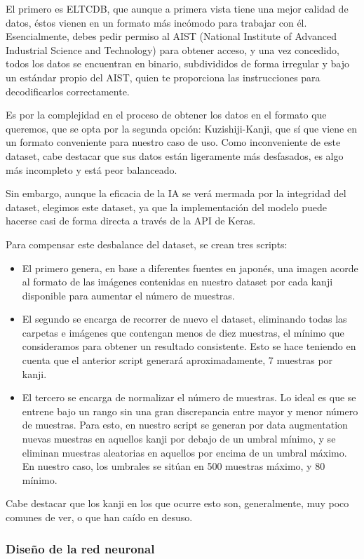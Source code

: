 \documentclass{article}
\begin{document}
El primero es ELTCDB, que aunque a primera vista tiene una mejor calidad de datos, éstos vienen en un formato más incómodo para trabajar con él. Esencialmente, debes pedir permiso al AIST (National Institute of Advanced Industrial Science and Technology) para obtener acceso, y una vez concedido, todos los datos se encuentran en binario, subdivididos de forma irregular y bajo un estándar propio del AIST, quien te proporciona las instrucciones para decodificarlos correctamente.

Es por la complejidad en el proceso de obtener los datos en el formato que queremos, que se opta por la segunda opción: Kuzishiji-Kanji, que sí que viene en un formato conveniente para nuestro caso de uso. Como inconveniente de este dataset, cabe destacar que sus datos están ligeramente más desfasados, es algo más incompleto y está peor balanceado.

Sin embargo, aunque la eficacia de la IA se verá mermada por la integridad del dataset, elegimos este dataset, ya que la implementación del modelo puede hacerse casi de forma directa a través de la API de Keras.

Para compensar este desbalance del dataset, se crean tres scripts:
\begin{itemize}
	\item El primero genera, en base a diferentes fuentes en japonés, una imagen acorde al formato de las imágenes contenidas en nuestro dataset por cada kanji disponible para aumentar el número de muestras.
	\item El segundo se encarga de recorrer de nuevo el dataset, eliminando todas las carpetas e imágenes que contengan menos de diez muestras, el mínimo que consideramos para obtener un resultado consistente. Esto se hace teniendo en cuenta que el anterior script generará aproximadamente, 7 muestras por kanji.
	\item El tercero se encarga de normalizar el número de muestras. Lo ideal es que se entrene bajo un rango sin una gran discrepancia entre mayor y menor número de muestras. Para esto, en nuestro script se generan por data augmentation nuevas muestras en aquellos kanji por debajo de un umbral mínimo, y se eliminan muestras aleatorias en aquellos por encima de un umbral máximo. En nuestro caso, los umbrales se sitúan en 500 muestras máximo, y 80 mínimo.
\end{itemize}
Cabe destacar que los kanji en los que ocurre esto son, generalmente, muy poco comunes de ver, o que han caído en desuso.

\subsubsection{Diseño de la red neuronal}
\end{document}
